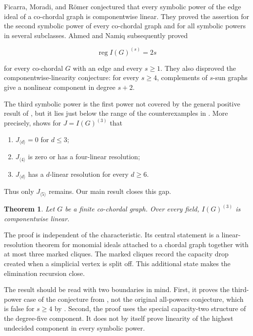 \documentclass[11pt]{article}
\newtheorem{theorem}{Theorem}[section]
\theoremstyle{definition}
\theoremstyle{remark}
\numberwithin{equation}{section}
\begin{document}
Ficarra, Moradi, and Römer \cite{ficarra2024} conjectured that every symbolic power of the edge
ideal of a co-chordal graph is componentwise linear. They proved the assertion
for the second symbolic power of every co-chordal graph and for all symbolic
powers in several subclasses. Ahmed and Namiq \cite{ahmed2026} subsequently proved

\nopagebreak[4]
\[
\operatorname{reg} I(G)^{(s)}=2s
\]

for every co-chordal $G$ with an edge and every $s\geq1$. They also disproved
the componentwise-linearity conjecture: for every $s\geq4$, complements of
$s$-sun graphs give a nonlinear component in degree $s+2$.

The third symbolic power is the first power not covered by the general positive
result of \cite{ficarra2024}, but it lies just below the range of the counterexamples in \cite{ahmed2026}.
More precisely, \cite[Theorem 1.2]{ahmed2026} shows for $J=I(G)^{(3)}$ that

\begin{enumerate}
\item $J_{\langle d\rangle}=0$ for $d\leq3$;
\item $J_{\langle4\rangle}$ is zero or has a four-linear resolution;
\item $J_{\langle d\rangle}$ has a $d$-linear resolution for every $d\geq6$.
\end{enumerate}

Thus only $J_{\langle5\rangle}$ remains. Our main result closes this gap.

\Needspace{0.25\textheight}
\begin{theorem}

Let $G$ be a finite co-chordal graph. Over every field,
$I(G)^{(3)}$ is componentwise linear.

\end{theorem}


The proof is independent of the characteristic. Its central statement is a
linear-resolution theorem for monomial ideals attached to a chordal graph
together with at most three marked cliques. The marked cliques record the
capacity drop created when a simplicial vertex is split off. This additional
state makes the elimination recursion close.

The result should be read with two boundaries in mind. First, it proves the
third-power case of the conjecture from \cite{ficarra2024}, not the original all-powers
conjecture, which is false for $s\geq4$ by \cite{ahmed2026}. Second, the proof uses the
special capacity-two structure of the degree-five component. It does not by
itself prove linearity of the highest undecided component in every symbolic
power.
\end{document}

